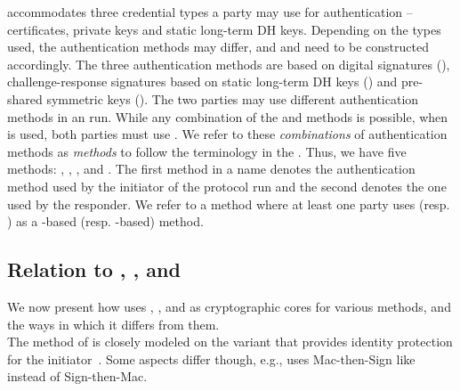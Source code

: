 \mEdhoc{} accommodates three credential types
a party may use for authentication -- certificates, private keys
and static long-term DH keys.
%
Depending on the types used, the authentication methods may differ,
and \mAuthi{} and \mAuthr{} need to be constructed accordingly.
%
The three authentication methods are based on digital signatures (\mSig),
challenge-response signatures based on static long-term DH keys (\mStat) and
pre-shared symmetric keys (\mPsk).
%
The two parties may use different authentication methods in an \mEdhoc{} run.
%
While any combination of the \mSig{} and \mStat{} methods is possible,
when \mPsk{} is used, both parties must use \mPsk{}.
%
We refer to these \emph{combinations} of authentication methods as
\emph{methods} to follow the terminology in the \mSpec{}.
%
Thus, we have five methods: \mSigSig, \mSigStat, \mStatStat, \mStatSig{} and
\mPskPsk.
%
The first method in a name denotes the
authentication method used by the initiator of the protocol run and the second denotes the
one used by the responder.
%
We refer to a method where at least one party uses \mSig{} (resp. \mStat) as a \mSig-based (resp. \mStat-based)
method.
%

%

 
\subsection{Relation to \mSigma, \mOptls{}, and \mNoise{}}
\label{sec:relationsToOtherProtocols}
We now present how \mEdhoc{} uses \mSigma, \mOptls{}, and \mNoise{} as
cryptographic cores for various methods, and the ways in which it differs from them.
\\
%
%

\runhead{\mSigma{}}
\label{sec:sigma}
The \mSigSig{} method of \mEdhoc{} is closely modeled on the \mSigma{}
variant that provides identity protection for the initiator~\cite{sigma}.
%
Some aspects differ though, e.g., \mSigSig{} uses Mac-then-Sign like
\mTls{} instead of Sign-then-Mac. 
%
\\

